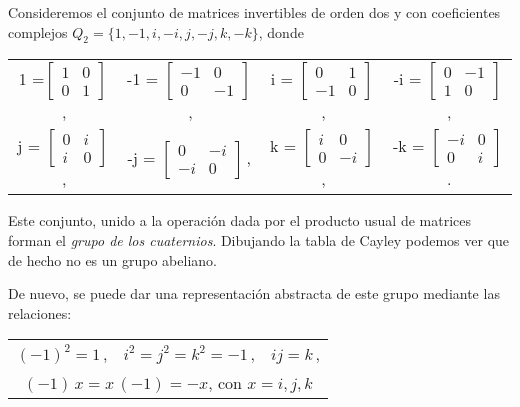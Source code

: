 Consideremos el conjunto de matrices invertibles de orden dos y con coeficientes complejos $Q_2 = \{1, -1, i, -i, j, -j, k, -k\}$, donde
\begin{center}
  \begin{tabular}{cccc}
    1 =$\begin{bmatrix}
                1 & 0  \\
                0 & 1 
    \end{bmatrix}$\,, & -1 = $\begin{bmatrix}
                -1 & 0  \\
                0 & -1 
              \end{bmatrix}$\,, & i = $\begin{bmatrix}
                0 & 1  \\
                -1 & 0 
              \end{bmatrix}$\,, & -i = $\begin{bmatrix}
                0 & -1  \\
                1 & 0 
              \end{bmatrix}$\,,\\[2em]
    j = $\begin{bmatrix}
                0 & i  \\
                i & 0 
              \end{bmatrix}$\,, &
    -j = $\begin{bmatrix}
                0 & -i  \\
                -i & 0 
              \end{bmatrix}$\,, &
    k = $\begin{bmatrix}
                i & 0  \\
                0 & -i
              \end{bmatrix}$\,, &
    -k = $\begin{bmatrix}
                -i & 0  \\
                0 & i
              \end{bmatrix}$\,.
  \end{tabular}
\end{center}
Este conjunto, unido a la operación dada por el producto usual de matrices forman el \textit{grupo de los cuaternios}. Dibujando la tabla de Cayley podemos ver que de hecho no es un grupo abeliano.

De nuevo, se puede dar una representación abstracta de este grupo mediante las relaciones:
\begin{center}
  \begin{tabular}{ccc}
    $(-1)^2 = 1$\,, & $i^2 = j^2 = k^2 = -1$\,, & $ij = k$\,,\\
    \multicolumn{3}{c}{$(-1)\,x = x\,(-1) = -x$, \enspace con $x = i,j,k$}
  \end{tabular}
\end{center}

